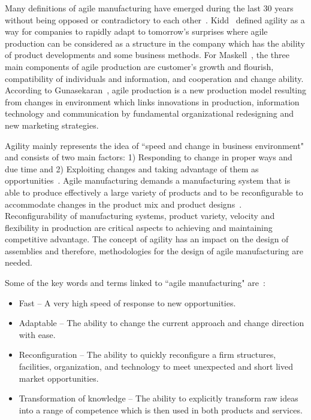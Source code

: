 Many definitions of agile manufacturing have emerged during the last 30 years without being opposed or contradictory to each other~\cite{Dahmardeh.2010}. Kidd~\cite{KIDD.2000} defined agility as a way for companies to rapidly adapt to tomorrow's surprises where agile production can be considered as a structure in the company which has the ability of product developments and some business methods. For Maskell~\cite{Maskell.2001}, the three main components of agile production are customer's growth and flourish, compatibility of individuals and information, and cooperation and change ability. According to Gunasekaran~\cite{GUNASEKARAN.1999}, agile production is a new production model resulting from changes in environment which links innovations in production, information technology and communication by fundamental organizational redesigning and new marketing strategies.

Agility mainly represents the idea of ``speed and change in business environment" and consists of two main factors: 1) Responding to change in proper ways and due time and 2) Exploiting changes and taking advantage of them as opportunities~\cite{SHARIFI.1999}. Agile manufacturing demands a manufacturing system that is able to produce effectively a large variety of products and to be reconfigurable to accommodate changes in the product mix and product designs~\cite{GUNASEKARAN.1999}. Reconfigurability of manufacturing systems, product variety, velocity and flexibility in production are critical aspects to achieving and maintaining competitive advantage. The concept of agility has an impact on the design of assemblies and therefore, methodologies for the design of agile manufacturing are needed.

Some of the key words and terms linked to ``agile manufacturing" are~\cite{KIDD.2000}:
\begin{itemize}
\item Fast -- A very high speed of response to new opportunities.
\item Adaptable -- The ability to change the current approach and change direction with ease.
\item Reconfiguration -- The ability to quickly reconfigure a firm structures, facilities, organization, and technology to meet unexpected and short lived market opportunities.
\item Transformation of knowledge -- The ability to explicitly transform raw ideas into a range of competence which is then used in both products and services.
\end{itemize}

